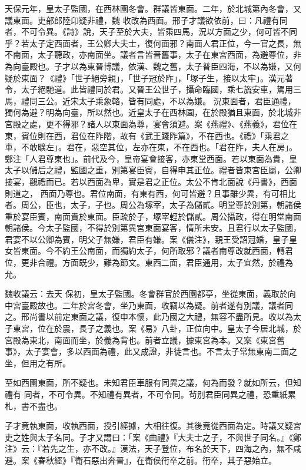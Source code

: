 \begin{pinyinscope}
 天保元年，皇太子監國，在西林園冬會。群議皆東面。二年，於北城第內冬會，又議東面。吏部郎陸卬疑非禮，魏
 收改為西面。邢子才議欲依前，曰：凡禮有同者，不可令異。《詩》說，天子至於大夫，皆乘四馬，況以方面之少，何可皆不同乎？若太子定西面者，王公卿大夫士，復何面邪？南面人君正位，今一官之長，無不南面，太子聽政，亦南面坐。議者言皆晉舊事，太子在東宮西面，為避尊位，非為向臺殿也。子才以為東晉博議，依漢、魏之舊，太子普臣四海，不以為嫌，又何疑於東面？《禮》「世子絕旁親」，「世子冠於阼」，「塚子生，接以太牢」。漢元著令，太子絕馳道。此皆禮同於君。又晉王公世子，攝命臨國，乘七旒安車，駕用三馬，禮同三公。近宋太子乘象輅，皆有同處，不以為嫌。
 況東面者，君臣通禮，獨何為避？明為向臺，所以然也。近皇太子在西林園，在於殿猶且東面，於北城非宮殿之處，更不得邪？諸人以東面為尊，宴會須避。案《燕禮》、《燕義》，君位在東，賓位則在西，君位在阼階，故有《武王踐阼篇》，不在西也。《禮》「乘君之車，不敢曠左」。君在，惡空其位，左亦在東，不在西也。「君在阼，夫人在房」。鄭注「人君尊東也」。前代及今，皇帝宴會接客，亦東堂西面。若以東面為貴，皇太子以儲后之禮，監國之重，別第宴臣賓，自得申其正位。禮者皆東宮臣屬，公卿接宴，觀禮而已。若以西面為卑，實是君之正位。太公不肯北面說《丹書》，西面則道之，
 西面乃尊也。君位南面，有東有西，何可皆避？且事雖少異，有可相比者。周公，臣也，太子，子也。周公為塚宰，太子為儲貳。明堂尊於別第，朝諸侯重於宴臣賓，南面貴於東面。臣疏於子，塚宰輕於儲貳。周公攝政，得在明堂南面朝諸侯。今太子監國，不得於別第異宮東面宴客，情所未安。且君行以太子監國，君宴不以公卿為賓，明父子無嫌，君臣有嫌。案《儀注》，親王受詔冠婚，皇子皇女皆東面。今不約王公南面，而獨約太子，何所取邪？議者南尊改就西面，轉君位，更非合禮。方面既少，難為節文。東西二面，君臣通用，太子宜然，於禮為允。



 魏收議云：去天
 保初，皇太子監國。冬會群官於西園都亭，坐從東面，義取於向中宮臺殿故也。二年於宮冬會，坐乃東面，收竊以為疑。前者遂有別議，議者同之。邢尚書以前定東面之議，復申本懷，此乃國之大禮，無容不盡所見。收以為太子東宮，位在於震，長子之義也。案《易》八卦，正位向中。皇太子今居北城，於宮殿為東北，南面而坐，於義為背也。前者立議，據東宮為本。又案《東宮舊事》，太子宴會，多以西面為禮，此又成證，非徒言也。不言太子常無東南二面之坐，但用之有所。



 至如西園東面，所不疑也。未知君臣車服有同異之議，何為而發？就如所云，但知禮有
 同者，不可令異。不知禮有異者，不可令同。茍別君臣同異之禮，恐重紙累札，書不盡也。



 子才竟執東面，收執西面，授引經據，大相往復。其後竟從西面為定。時議又疑宮吏之姓與太子名同。子才又謂曰：「案《曲禮》『大夫士之子，不與世子同名。』《鄭注》云：『若先之生，亦不改。』漢法，天子登位，布名於天下，四海之內，無不咸避。案《春秋經》『衛石惡出奔晉』，在衛侯衎卒之前。衎卒，其子惡始立。




\end{pinyinscope}
